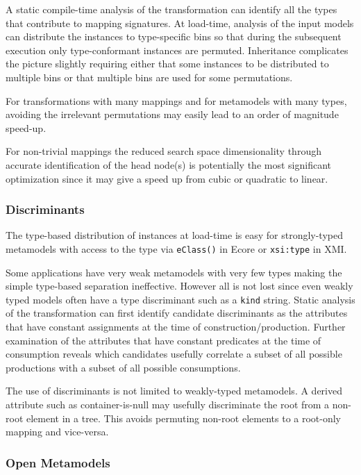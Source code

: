 \documentclass{jot}
\begin{document}
A static compile-time analysis of the transformation can identify all the types that contribute to mapping signatures. At load-time, analysis of the input models can distribute the instances to type-specific bins so that during the subsequent execution only type-conformant instances are permuted. Inheritance complicates the picture slightly requiring either that some instances to be distributed to multiple bins or that multiple bins are used for some permutations.

For transformations with many mappings and for metamodels with many types, avoiding the irrelevant permutations may easily lead to an order of magnitude speed-up.

For non-trivial mappings the reduced search space dimensionality through accurate identification of the head node(s) is potentially the most significant optimization since it may give a speed up from cubic or quadratic to linear.

\subsubsection{Discriminants}

The type-based distribution of instances at load-time is easy for strongly-typed metamodels with access to the type via \verb|eClass()| in Ecore or \verb|xsi:type| in XMI.

Some applications have very weak metamodels with very few types making the simple type-based separation ineffective. However all is not lost since even weakly typed models often have a type discriminant such as a \verb|kind| string. Static analysis of the transformation can first identify candidate discriminants as the attributes that have constant assignments at the time of construction/production. Further examination of the attributes that have constant predicates at the time of consumption reveals which candidates usefully correlate a subset of all possible productions with a subset of all possible consumptions.

The use of discriminants is not limited to weakly-typed metamodels. A derived attribute such as container-is-null may usefully discriminate the root from a non-root element in a tree. This avoids permuting non-root elements to a root-only mapping and vice-versa. 

\subsubsection{Open Metamodels}
\end{document}
